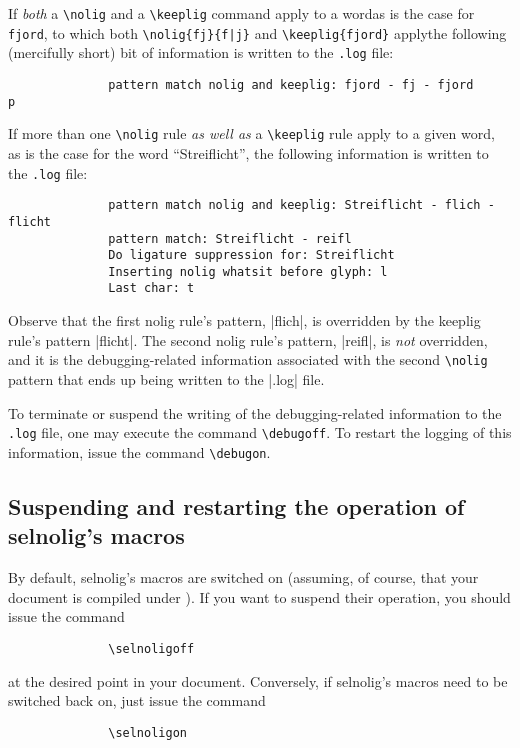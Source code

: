 \documentclass[11pt]{article}
\newcommand{\pkg}[1]{\textsf{#1}}
\newcommand{\opt}[1]{\texttt{#1}}
\newcommand{\cmmd}[1]{\texttt{\textbackslash #1}}
\begin{document}
If \emph{both} a \cmmd{nolig} and a \cmmd{keeplig} command apply to a word\textemdash as is the case for \opt{fjord}, to which both \Verb+\nolig{fj}{f|j}+ and \Verb+\keeplig{fjord}+ apply\textemdash the following (mercifully short) bit of information is written to the \opt{.log} file:
\begin{Verbatim}
              pattern match nolig and keeplig: fjord - fj - fjord
p\end{Verbatim}

If more than one \cmmd{nolig} rule \emph{as well as} a \cmmd{keeplig} rule apply to a given word, as is the case for the word \enquote{Streiflicht}, the following information is written to the \opt{.log} file:
\begin{Verbatim}
              pattern match nolig and keeplig: Streiflicht - flich - flicht
              pattern match: Streiflicht - reifl
              Do ligature suppression for: Streiflicht
              Inserting nolig whatsit before glyph: l
              Last char: t
              \end{Verbatim}

Observe that the first nolig rule's pattern, |flich|, is overridden by the keeplig rule's pattern |flicht|. The second nolig rule's pattern, |reifl|, is \emph{not} overridden, and it is the debugging-related information associated with the second \cmmd{nolig} pattern that ends up being written to the |.log| file. 

To terminate or suspend the writing of the debugging-related information to the \opt{.log} file, one may execute the command \cmmd{debugoff}. To restart the logging of this information, issue the command \cmmd{debugon}.



\subsection[Suspending and restarting the operation of selnolig's macros]{Suspending and restarting the operation of \pkg{selnolig}'s macros}

By default, \pkg{selnolig}'s macros are switched on (assuming, of course, that your document is compiled under \LuaLaTeX). If you want to suspend their operation, you should issue the command
\begin{Verbatim}
              \selnoligoff
\end{Verbatim}
at the desired point in your document. Conversely, if \pkg{selnolig}'s macros need to be switched back on, just issue the command
\begin{Verbatim}
              \selnoligon
\end{Verbatim}
\end{document}
